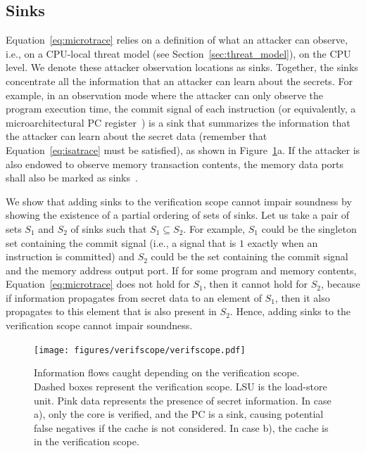 \subsection{Sinks}
\label{subsec:sinks}

Equation~\ref{eq:microtrace} relies on a definition of what an attacker can observe, i.e., on a CPU-local threat model (see Section~\ref{sec:threat_model}), on the CPU level.
We denote these attacker observation locations as sinks.
Together, the sinks concentrate all the information that an attacker can learn about the secrets.
For example, in an observation mode where the attacker can only observe the program execution time, the commit signal of each instruction (or equivalently, a microarchitectural PC register~\cite{ceesay2024mucfi}) is a sink that summarizes the information that the attacker can learn about the secret data (remember that Equation~\ref{eq:isatrace} must be satisfied), as shown in Figure~\ref{fig:verifscope}a.
If the attacker is also endowed to observe memory transaction contents, the memory data ports shall also be marked as sinks~\cite{wang2023specification}.

We show that adding sinks to the verification scope cannot impair soundness by showing the existence of a partial ordering of sets of sinks.
Let us take a pair of sets $S_1$ and $S_2$ of sinks such that $S_1 \subseteq S_2$.
For example, $S_1$ could be the singleton set containing the commit signal (i.e., a signal that is $1$ exactly when an instruction is committed) and $S_2$ could be the set containing the commit signal and the memory address output port.
If for some program and memory contents, Equation~\ref{eq:microtrace} does not hold for $S_1$, then it cannot hold for $S_2$, because if information propagates from secret data to an element of $S_1$, then it also propagates to this element that is also present in $S_2$.
Hence, adding sinks to the verification scope cannot impair soundness.

\begin{figure}
    \begin{center}
    \texttt{[image: figures/verifscope/verifscope.pdf]}
    \end{center}
    \vspace*{-1em}
    \caption{Information flows caught depending on the verification scope. Dashed boxes represent the verification scope. LSU is the load-store unit. Pink data represents the presence of secret information. In case a), only the core is verified, and the PC is a sink, causing potential false negatives if the cache is not considered. In case b), the cache is in the verification scope.
    \label{fig:verifscope} }
    \vspace*{-1.4em}
\end{figure}


